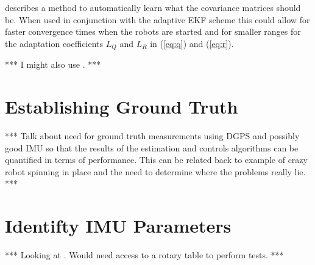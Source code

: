 \cite{Abbeel-RSS-05} describes a method to automatically learn what the covariance matrices should be. When used in conjunction with the adaptive EKF scheme this could allow for faster convergence times when the robots are started and for smaller ranges for the adaptation coefficients $L_Q$ and $L_R$ in (\ref{eq:q}) and (\ref{eq:r}).

*** I might also use \cite{Orderud05}. ***

\section{Establishing Ground Truth}
\label{sec:groundtruth}
*** Talk about need for ground truth measurements using DGPS and possibly good IMU so that the results of the estimation and controls algorithms can be quantified in terms of performance. This can be related back to example of crazy robot spinning in place and the need to determine where the problems really lie. ***

\section{Identifty IMU Parameters}
\label{sec:identifyimuparams}
*** Looking at \cite{ChungOjeda01}. Would need access to a rotary table to perform tests. ***